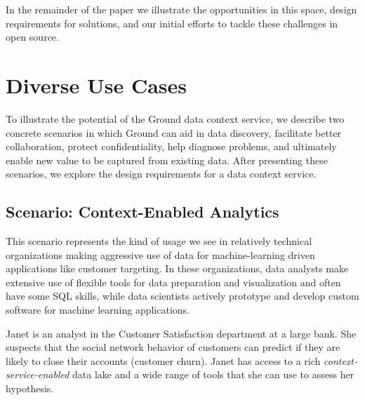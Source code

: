 \documentclass{sig-alternate}
\begin{document}
In the remainder of the paper we illustrate the opportunities in this space, design requirements for solutions, and our initial efforts to tackle these challenges in open source.

\section{Diverse Use Cases}
\label{sec:scenarios}
To illustrate the potential of the Ground data context service, we describe two concrete scenarios in which Ground
can aid in data discovery, facilitate better collaboration, protect confidentiality, help diagnose problems, and ultimately enable new value to be captured from existing data.
After presenting these scenarios, we explore the design requirements for a data context service.


\subsection{Scenario: Context-Enabled Analytics }
This scenario represents the kind of usage we see in relatively technical organizations making aggressive use of data for machine-learning driven applications like customer targeting. In these organizations, data analysts make extensive use of flexible tools for data preparation and visualization and often have some SQL skills, while data scientists actively prototype and develop custom software for machine learning applications.

Janet is an 
analyst in the Customer Satisfaction department at a large bank. 
She suspects that the social network behavior of customers can predict if they are likely to close their accounts (customer churn).
Janet has access to a rich \emph{context-service-enabled} data lake and a wide range of tools that she can use 
to assess her hypothesis. 
\end{document}
